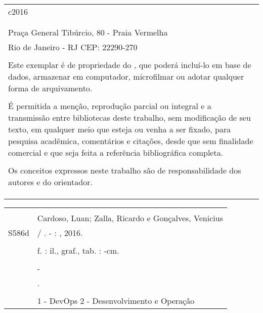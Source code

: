 \begin{fichacatalografica}
	\begin{tabular}{@{\hspace{0cm}}p{14.8cm}}
	c2016\\
	\\
	\imprimirinstituicao\\
	Praça General Tibúrcio, 80 - Praia Vermelha\\
	Rio de Janeiro - RJ \hspace{1.5cm} CEP: 22290-270\\
	\\
	Este exemplar é de propriedade do \imprimirinstituicao, que poderá incluí-lo em base de dados, armazenar em computador, microfilmar ou adotar qualquer forma de arquivamento.\\
	\\
	É permitida a menção, reprodução parcial ou integral e a transmissão entre bibliotecas deste trabalho, sem modificação de seu texto, em qualquer meio que esteja ou venha a ser fixado, para pesquisa acadêmica, comentários e citações, desde que sem finalidade comercial e que seja feita a referência bibliográfica completa.\\
	\\
	Os conceitos expressos neste trabalho são de responsabilidade dos autores e do orientador.\\
	\\
	\\
	\\
	\end{tabular}

	\small
	\begin{center}
	\begin{tabular}{|cp{13cm}|} \hline
		\hspace{1.3cm} & \\
		& Cardoso, Luan; Zalla, Ricardo e Gonçalves, Venicius \\
		\hspace{0.2cm} S586d & \hspace{0.3cm} \imprimirtitulo{} / \imprimirautor. - \imprimirlocal: \imprimirinstituicao, 2016. \\
		& \\
		& \hspace{0.65cm} \pageref{LastPage}f. : il., graf., tab. : -cm. \\
		& \\
		& \hspace{0.6cm} \imprimirtipotrabalho{} - \imprimirinstituicao \\
		& \hspace{0.6cm} \imprimirorientadorRotulo{} \imprimirorientador.\\
		& \\
		& \hspace{0.6cm} 1 - DevOps \hspace{0.1cm} 2 - Desenvolvimento e Operação\\
		

\end{tabular}
\end{center}
\end{fichacatalografica}
